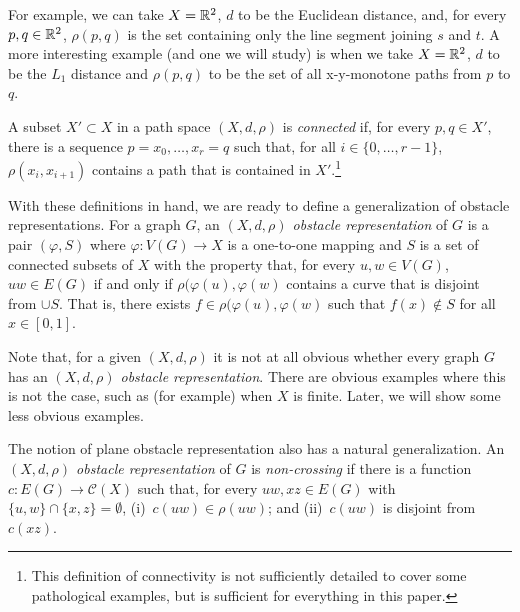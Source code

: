 \documentclass{patmorin}
\begin{document}
For example, we can take $X=\mathbb{R}^2$, $d$ to be the Euclidean distance,
and, for every $p,q\in\mathbb{R}^2$, $\rho(p,q)$ is the set containing only the
line segment joining $s$ and $t$.  A more interesting example (and one
we will study) is when we take $X=\mathbb{R}^2$, $d$ to be the $L_1$ distance
and $\rho(p,q)$ to be the set of all x-y-monotone paths from $p$ to $q$.

A subset $X'\subset X$ in a path space $(X,d,\rho)$ is \emph{connected}
if, for every $p,q\in X'$, there is a sequence $p=x_0,\ldots,x_r=q$ such
that, for all $i\in\{0,\ldots,r-1\}$, $\rho(x_i,x_{i+1})$ contains a path
that is contained in $X'$.\footnote{This definition of connectivity is
not sufficiently detailed to cover some pathological examples, but is
sufficient for everything in this paper.}

With these definitions in hand, we are ready to define a generalization of
obstacle representations.  For a graph $G$, an \emph{$(X,d,\rho)$ obstacle
representation} of $G$ is a pair $(\varphi, S)$ where $\varphi:V(G)\to
X$ is a one-to-one mapping and $S$ is a set of connected subsets of $X$
with the property that, for every $u,w\in V(G)$, $uw\in E(G)$ if and
only if $\rho(\varphi(u),\varphi(w)$ contains a curve that is disjoint
from $\cup S$. That is, there exists $f\in\rho(\varphi(u),\varphi(w)$
such that $f(x)\not\in S$ for all $x\in[0,1]$.

Note that, for a given $(X,d,\rho)$ it is not at all obvious whether every
graph $G$ has an \emph{$(X,d,\rho)$ obstacle representation}.  There are
obvious examples where this is not the case, such as (for example)
when $X$ is finite.  Later, we will show some less obvious examples.

The notion of plane obstacle representation also has a natural
generalization.  An \emph{$(X,d,\rho)$ obstacle representation} of $G$
is \emph{non-crossing} if there is a function $c:E(G)\to \mathcal{C}(X)$
such that, for every $uw,xz\in E(G)$ with $\{u,w\}\cap \{x,z\}=\emptyset$,
(i)~$c(uw)\in \rho(uw)$; and (ii)~$c(uw)$ is disjoint from $c(xz)$.
\end{document}
